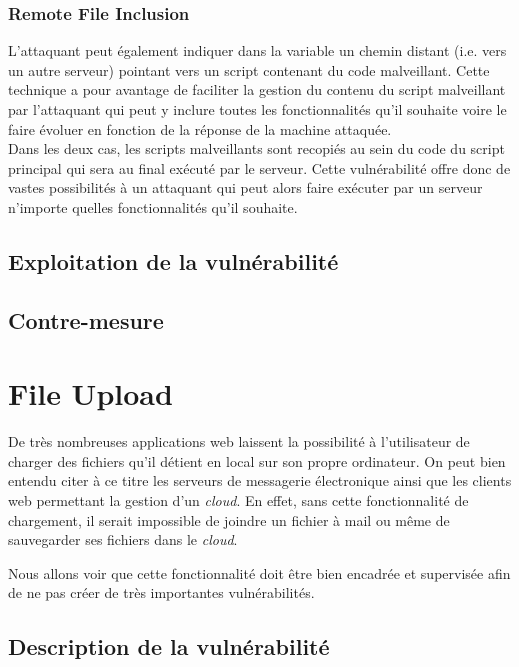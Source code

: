 \subsubsection{Remote File Inclusion}

L'attaquant peut également indiquer dans la variable un chemin distant (i.e. vers un autre serveur) pointant vers un script contenant du code malveillant. Cette technique a pour avantage de faciliter la gestion du contenu du script malveillant par l'attaquant qui peut y inclure toutes les fonctionnalités qu'il souhaite voire le faire évoluer en fonction de la réponse de la machine attaquée.\\

Dans les deux cas, les scripts malveillants sont recopiés au sein du code du script principal qui sera au final exécuté par le serveur. Cette vulnérabilité offre donc de vastes possibilités à un attaquant qui peut alors faire exécuter par un serveur n'importe quelles fonctionnalités qu'il souhaite.

\subsection{Exploitation de la vulnérabilité}

\subsection{Contre-mesure}

\section{File Upload}

De très nombreuses applications web laissent la possibilité à l'utilisateur de charger des fichiers qu'il détient en local sur son propre ordinateur. On peut bien entendu citer à ce titre les serveurs de messagerie électronique ainsi que les clients web permettant la gestion d'un \textit{cloud}. En effet, sans cette fonctionnalité de chargement, il serait impossible de joindre un fichier à mail ou même de sauvegarder ses fichiers dans le \textit{cloud}. 

Nous allons voir que cette fonctionnalité doit être bien encadrée et supervisée afin de ne pas créer de très importantes vulnérabilités.

\subsection{Description de la vulnérabilité}

